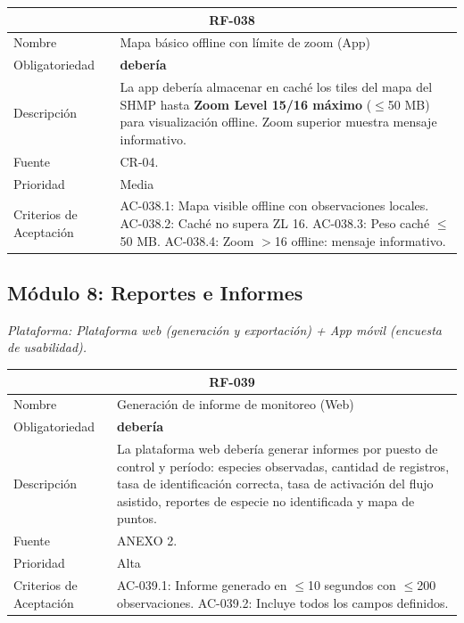 \documentclass[12pt, a4paper]{article}
\begin{document}
\begin{longtable}{|p{3cm}|p{11.5cm}|}
\hline
\multicolumn{2}{|c|}{\textbf{RF-038}} \\
\hline
Nombre & Mapa b\'asico offline con l\'imite de zoom (App) \\
\hline
Obligatoriedad & \textbf{deber\'ia} \\
\hline
Descripci\'on & La app deber\'ia almacenar en cach\'e los tiles del mapa del SHMP hasta \textbf{Zoom Level 15/16 m\'aximo} ($\leq$50 MB) para visualizaci\'on offline. Zoom superior muestra mensaje informativo. \\
\hline
Fuente & CR-04. \\
\hline
Prioridad & Media \\
\hline
Criterios de Aceptaci\'on &
AC-038.1: Mapa visible offline con observaciones locales. \newline
AC-038.2: Cach\'e no supera ZL 16. \newline
AC-038.3: Peso cach\'e $\leq$50 MB. \newline
AC-038.4: Zoom $>$16 offline: mensaje informativo. \\
\hline
\end{longtable}

\subsection{M\'odulo 8: Reportes e Informes}

\textit{Plataforma: Plataforma web (generaci\'on y exportaci\'on) + App m\'ovil (encuesta de usabilidad).}

\begin{longtable}{|p{3cm}|p{11.5cm}|}
\hline
\multicolumn{2}{|c|}{\textbf{RF-039}} \\
\hline
Nombre & Generaci\'on de informe de monitoreo (Web) \\
\hline
Obligatoriedad & \textbf{deber\'ia} \\
\hline
Descripci\'on & La plataforma web deber\'ia generar informes por puesto de control y per\'iodo: especies observadas, cantidad de registros, tasa de identificaci\'on correcta, tasa de activaci\'on del flujo asistido, reportes de especie no identificada y mapa de puntos. \\
\hline
Fuente & ANEXO 2. \\
\hline
Prioridad & Alta \\
\hline
Criterios de Aceptaci\'on &
AC-039.1: Informe generado en $\leq$10 segundos con $\leq$200 observaciones. \newline
AC-039.2: Incluye todos los campos definidos. \\
\hline
\end{longtable}
\end{document}
